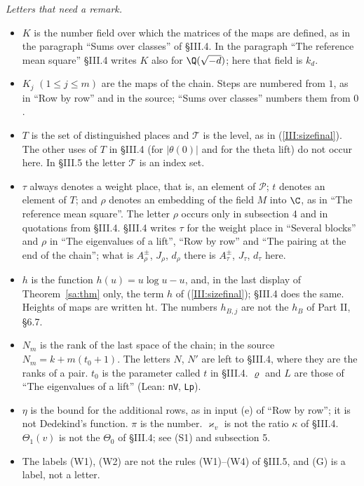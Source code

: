 \documentclass[11pt,letterpaper]{article}
\begin{document}
\emph{Letters that need a remark.}
\begin{itemize}[leftmargin=1.6em,itemsep=1pt,topsep=3pt]
\item $K$ is the number field over which the matrices of the maps are defined, as in the paragraph
``Sums over classes'' of \S III.4. In the paragraph ``The reference mean square'' \S III.4 writes $K$
also for $\Q(\sqrt{-d})$; here that field is $k_d$.
\item $K_j$ $(1\le j\le m)$ are the maps of the chain. Steps are numbered from $1$, as in ``Row by row''
and in the source; ``Sums over classes'' numbers them from $0$.
\item $T$ is the set of distinguished places and $\mathcal T$ is the level, as in (\ref{III:sizefinal}). The
other uses of $T$ in \S III.4 (for $|\theta(0)|$ and for the theta lift) do not occur here. In \S III.5
the letter $\mathcal T$ is an index set.
\item $\tau$ always denotes a weight place, that is, an element of $\mathcal P$; $t$ denotes an element
of $T$; and $\rho$ denotes an embedding of the field $M$ into $\C$, as in ``The reference mean square''.
The letter $\rho$ occurs only in subsection 4 and in quotations from \S III.4. \S III.4 writes $\tau$ for the weight place in ``Several
blocks'' and $\rho$ in ``The eigenvalues of a lift'', ``Row by row'' and ``The pairing at the end of the
chain''; what is $A_\rho^{\pm}$, $J_\rho$, $d_\rho$ there is $A_\tau^{\pm}$, $J_\tau$, $d_\tau$ here.
\item $h$ is the function $h(u)=u\log u-u$, and, in the last display of Theorem~\ref{sa:thm} only, the
term $h$ of (\ref{III:sizefinal}); \S III.4 does the same. Heights of maps are written $\mathrm{ht}$. The numbers
$h_{B,j}$ are not the $h_B$ of Part II, \S6.7.
\item $N_m$ is the rank of the last space of the chain; in the source $N_m=k+m(t_0+1)$. The letters $N$,
$N'$ are left to \S III.4, where they are the ranks of a pair. $t_0$ is the parameter called $t$ in
\S III.4. $\varrho$ and $L$ are those of ``The eigenvalues of a lift'' (Lean: \texttt{nV}, \texttt{Lp}).
\item $\eta$ is the bound for the additional rows, as in input (e) of ``Row by row''; it is not
Dedekind's function. $\pi$ is the number. $\varkappa_v$ is not the ratio $\kappa$ of \S III.4.
$\Theta_1(v)$ is not the $\Theta_0$ of \S III.4; see (S1) and subsection 5.
\item The labels (W1), (W2) are not the rules (W1)--(W4) of \S III.5, and (G) is a label, not a letter.

\end{itemize}
\end{document}
